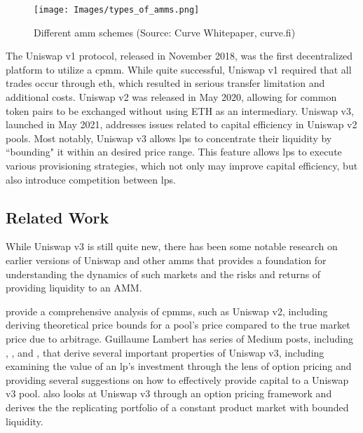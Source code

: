 \documentclass[11pt]{article}
\begin{document}
\begin{figure}[H]
    \centering
    \texttt{[image: Images/types\_of\_amms.png]}
    \caption{Different \gls{amm} schemes (Source: Curve Whitepaper, curve.fi)}
    \label{fig:amm_schemes}
\end{figure}

The Uniswap v1 protocol, released in November 2018, was the first decentralized platform to utilize a \gls{cpmm}. While quite successful, Uniswap v1 required that all trades occur through \gls{eth}, which resulted in serious transfer limitation and additional costs. Uniswap v2 was released in May 2020, allowing for common token pairs to be exchanged without using ETH as an intermediary. Uniswap v3, launched in May 2021, addresses issues related to capital efficiency in Uniswap v2 pools. Most notably, Uniswap v3 allows \glspl{lp} to concentrate their liquidity by ``bounding" it within an desired price range. This feature allows \glspl{lp} to execute various provisioning strategies, which not only may improve capital efficiency, but also introduce competition between \glspl{lp}.

\subsection{Related Work}

While Uniswap v3 is still quite new, there has been some notable research on earlier versions of Uniswap and other \glspl{amm} that provides a foundation for understanding the dynamics of such markets and the risks and returns of providing liquidity to an AMM.

\citet{angeris2021analysis} provide a comprehensive analysis of \glspl{cpmm}, such as Uniswap v2, including deriving theoretical price bounds for a pool's price compared to the true market price due to arbitrage. Guillaume Lambert has series of Medium posts, including \citet{LambertMedium1}, \citet{LambertMedium2}, and \citet{LambertMedium3}, that derive several important properties of Uniswap v3, including examining the value of an \gls{lp}'s investment through the lens of option pricing and providing several suggestions on how to effectively provide capital to a Uniswap v3 pool. \citet{ClarkReplicatingPortfolio} also looks at Uniswap v3 through an option pricing framework and derives the the replicating portfolio of a constant product market with bounded liquidity.
\end{document}
